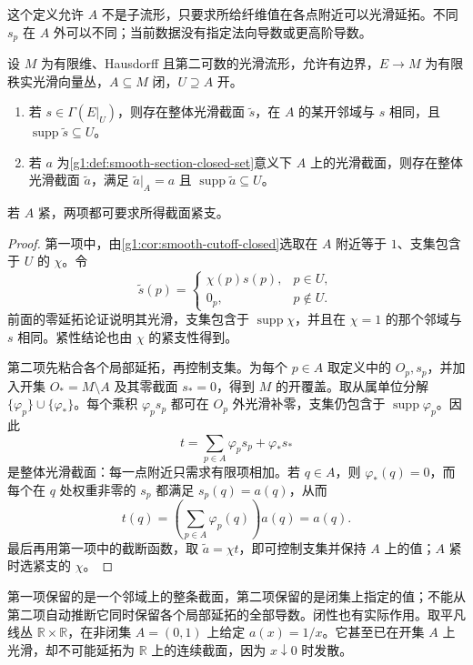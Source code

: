 这个定义允许 \(A\) 不是子流形，只要求所给纤维值在各点附近可以光滑延拓。不同 \(s_p\) 在 \(A\) 外可以不同；当前数据没有指定法向导数或更高阶导数。

\begin{theorem}\label{g1:thm:section-extension}
	设 \(M\) 为有限维、Hausdorff 且第二可数的光滑流形，允许有边界，\(E\to M\) 为有限秩实光滑向量丛，\(A\subseteq M\) 闭，\(U\supseteq A\) 开。
	\begin{enumerate}
		\item 若 \(s\in\Gamma(E|_U)\)，则存在整体光滑截面 \(\widetilde s\)，在 \(A\) 的某开邻域与 \(s\) 相同，且 \(\operatorname{supp}\widetilde s\subseteq U\)。
		\item 若 \(a\) 为\cref{g1:def:smooth-section-closed-set}意义下 \(A\) 上的光滑截面，则存在整体光滑截面 \(\widetilde a\)，满足 \(\widetilde a|_A=a\) 且 \(\operatorname{supp}\widetilde a\subseteq U\)。
	\end{enumerate}
	若 \(A\) 紧，两项都可要求所得截面紧支。
\end{theorem}
\begin{proof}
	第一项中，由\cref{g1:cor:smooth-cutoff-closed}选取在 \(A\) 附近等于 \(1\)、支集包含于 \(U\) 的 \(\chi\)。令
	\[
		\widetilde s(p)=
		\begin{cases}
			\chi(p)s(p),&p\in U,\\
			0_p,&p\notin U.
		\end{cases}
	\]
	前面的零延拓论证说明其光滑，支集包含于 \(\operatorname{supp}\chi\)，并且在 \(\chi=1\) 的那个邻域与 \(s\) 相同。紧性结论也由 \(\chi\) 的紧支性得到。

	第二项先粘合各个局部延拓，再控制支集。为每个 \(p\in A\) 取定义中的 \(O_p,s_p\)，并加入开集 \(O_*=M\setminus A\) 及其零截面 \(s_*=0\)，得到 \(M\) 的开覆盖。取从属单位分解 \(\{\varphi_p\}\cup\{\varphi_*\}\)。每个乘积 \(\varphi_p s_p\) 都可在 \(O_p\) 外光滑补零，支集仍包含于 \(\operatorname{supp}\varphi_p\)。因此
	\[
		t=\sum_{p\in A}\varphi_p s_p+\varphi_*s_*
	\]
	是整体光滑截面：每一点附近只需求有限项相加。若 \(q\in A\)，则 \(\varphi_*(q)=0\)，而每个在 \(q\) 处权重非零的 \(s_p\) 都满足 \(s_p(q)=a(q)\)，从而
	\[
		t(q)=\left(\sum_{p\in A}\varphi_p(q)\right)a(q)=a(q).
	\]
	最后再用第一项中的截断函数，取 \(\widetilde a=\chi t\)，即可控制支集并保持 \(A\) 上的值；\(A\) 紧时选紧支的 \(\chi\)。
\end{proof}

第一项保留的是一个邻域上的整条截面，第二项保留的是闭集上指定的值；不能从第二项自动推断它同时保留各个局部延拓的全部导数。闭性也有实际作用。取平凡线丛 \(\mathbb R\times\mathbb R\)，在非闭集 \(A=(0,1)\) 上给定 \(a(x)=1/x\)。它甚至已在开集 \(A\) 上光滑，却不可能延拓为 \(\mathbb R\) 上的连续截面，因为 \(x\downarrow0\) 时发散。

